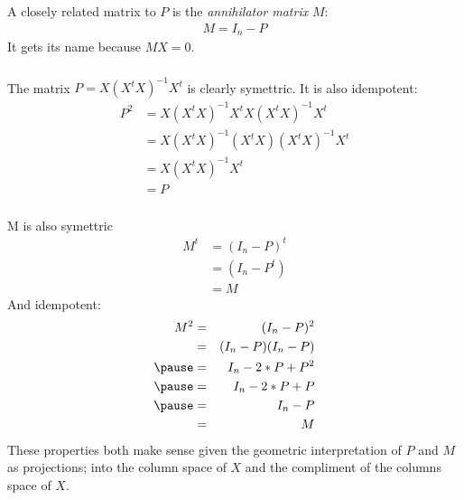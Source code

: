 \begin{frame}[fragile] \frametitle{}

A closely related matrix to $P$ is the {\it annihilator matrix}
$M$:
\begin{align*}
M = I_n - P
\end{align*}
\pause It gets its name because $MX = 0$.

\end{frame}

\begin{frame}[fragile] \frametitle{}

The matrix $P = X (X^t X)^{-1} X^t$ is clearly symettric.
It is also idempotent:
\begin{align*}
P^2 &= X (X^t X)^{-1} X^t X (X^t X)^{-1} X^t \\
&= X (X^t X)^{-1} (X^t X) (X^t X)^{-1} X^t \\
&= X (X^t X)^{-1} X^t \\
&= P
\end{align*}

\end{frame}

\begin{frame}[fragile] \frametitle{}

M is also symettric
\begin{align*}
M^t &= (I_n - P)^t \\
&= (I_n - P^t) \\
&= M
\end{align*}
\pause And idempotent:
\begin{eqnarray*}
M^2 &=&(I_n - P)^2 \\
&=& (I_n - P) (I_n - P) \\ \pause
&=& I_n - 2 * P + P^2 \\ \pause
&=& I_n - 2 * P + P \\ \pause
&=& I_n - P \\
&=& M
\end{eqnarray*}
\pause These properties both make sense given the geometric
interpretation of $P$ and $M$ as projections; into the column
space of $X$ and the compliment of the columns space of $X$.

\end{frame}

